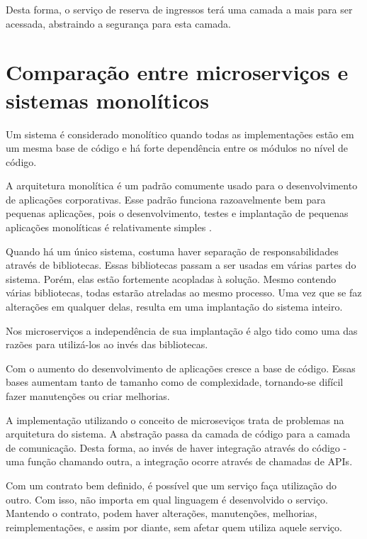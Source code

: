Desta forma, o serviço de reserva de ingressos terá uma camada a mais
para ser acessada, abstraindo a segurança para esta camada.

\section{Comparação entre microserviços e sistemas monolíticos}\label{microservicos-monoliticos}

Um sistema é considerado monolítico quando todas as implementações estão em um mesma base de código
e há forte dependência entre os módulos no nível de código.


\begin{citacao}
A arquitetura monolítica é um padrão comumente usado para o desenvolvimento de aplicações corporativas.
Esse padrão funciona razoavelmente bem para pequenas aplicações, pois o desenvolvimento, testes e
implantação de pequenas aplicações monolíticas é relativamente simples \cite{arquitetura-monolitica}.
\end{citacao}


Quando há um único sistema, costuma haver separação de responsabilidades através de bibliotecas.
Essas bibliotecas passam a ser usadas em várias partes do sistema. Porém, elas estão fortemente
acopladas à solução.
Mesmo contendo várias bibliotecas, todas estarão atreladas ao mesmo processo.
Uma vez que se faz alterações em qualquer delas, resulta em uma implantação do sistema inteiro.

Nos microserviços a independência de sua implantação é algo tido como uma das razões para
utilizá-los ao invés das bibliotecas.

Com o aumento do desenvolvimento de aplicações cresce a base de código.
Essas bases aumentam tanto de tamanho como de complexidade,
tornando-se difícil fazer manutenções ou criar melhorias.

A implementação utilizando o conceito de microseviços trata de problemas na arquitetura do sistema.
A abstração passa da camada de código para a camada de comunicação. Desta forma, ao invés de haver
integração através do código - uma função chamando outra, a integração ocorre através de chamadas de
APIs.

Com um contrato bem definido, é possível que um serviço faça utilização do outro.
Com isso, não importa em qual linguagem é desenvolvido o serviço.
Mantendo o contrato, podem haver alterações, manutenções, melhorias, reimplementações,
e assim por diante, sem afetar quem utiliza aquele serviço.


